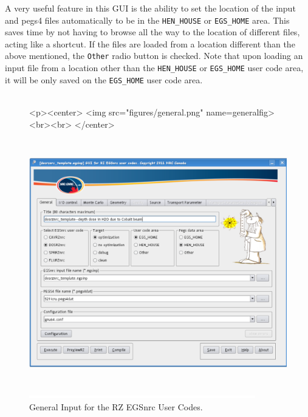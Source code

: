 \documentclass[12pt,twoside]{article}   %
\begin{document}
A very useful feature in this GUI is the ability to set the location of the input and
pegs4 files automatically to be in the {\tt HEN\_HOUSE} or {\tt EGS\_HOME} area. This saves
time by not having to browse all the way to the location of different files, acting like
a shortcut. If the files are loaded from a location different than the above
mentioned, the {\tt Other} radio button is checked. Note that upon loading an input file
from a location other than the {\tt HEN\_HOUSE} or {\tt EGS\_HOME} user code area, it will
be only saved on the {\tt EGS\_HOME} user code area. \\ \\
\begin{figure}[htb]
\begin{htmlonly}
\begin{rawhtml}
<p><center>
<img src="figures/general.png" name=generalfig><br><br>
</center>
\end{rawhtml}
\end{htmlonly}
\begin{latexonly}
\begin{center}
\includegraphics[height=10.78cm]{figures/general}
\end{center}
\end{latexonly}
\begin{center}
\includegraphics[height=1mm]{figures/fake2}
\end{center}
\caption{General Input for the RZ EGSnrc User Codes.}
\label{generalfig}
\end{figure}
\end{document}
